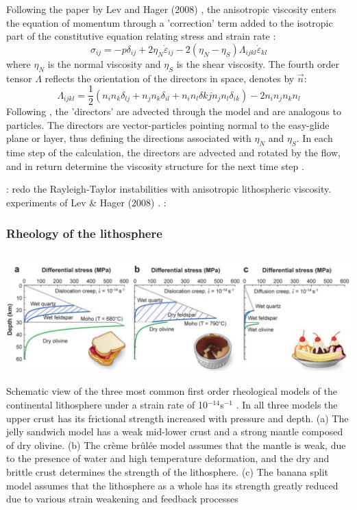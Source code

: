 Following the paper by Lev and Hager (2008) \cite{leha08}, 
the anisotropic viscosity enters the equation of momentum through a 'correction'
term added to the isotropic part of the constitutive equation relating
stress and strain rate \cite{mumh02}:
\[
\sigma_{ij} = -p \delta_{ij} + 2 \eta_N \dot{\varepsilon}_{ij}  - 2(\eta_N-\eta_S)\Lambda_{ijkl}\dot{\varepsilon}_{kl} 
\]
where $\eta_N$ is the normal viscosity and $\eta_S$ is the shear viscosity. 
The fourth order tensor $\Lambda$ reflects the orientation of the directors in space, denotes by $\vec{n}$:
\[
\Lambda_{ijkl}=\frac{1}{2} (n_i n_k \delta_{lj} + n_j n_k \delta_{il} + n_i n_l \delta{kj} n_j n_l \delta_{ik} )
- 2 n_i n_j n_k n_l 
\]
Following \cite{modm03,mumh02}, the 'directors' are advected through the model and are 
analogous to particles. The directors are
vector-particles pointing normal to the easy-glide plane or layer,
thus defining the directions associated with $\eta_N$ and $\eta_S$. 
In each time
step of the calculation, the directors are advected and rotated by the
flow, and in return determine the viscosity structure for the next time
step \cite{mumc04}.



\mscthesis: redo the Rayleigh-Taylor instabilities with anisotropic lithospheric viscosity.
experiments of Lev \& Hager (2008) \cite{leha08}.
\Literature: \cite{mumh02,vatb98,mumc04,mumh02,mima04,rida78,saab84}

\subsubsection{Rheology of the lithosphere}


\begin{center}
\includegraphics[height=5cm]{images/rheology/budr08}\\
{\scriptsize Schematic view of the three most common first order rheological models of the continental 
lithosphere under a strain rate of 10$^{-14}$s$^{-1}$ . 
In all three models the upper crust has its frictional strength increased with pressure and depth. 
(a) The jelly sandwich model has a weak mid-lower crust and a strong mantle composed of dry olivine. 
(b) The cr\`eme br\^ul\'ee model assumes that the mantle is weak, due to the presence of water and high 
temperature deformation, and the dry and brittle crust determines the strength of the lithosphere. 
(c) The banana split model assumes that the lithosphere as a whole has its strength greatly reduced
due to various strain weakening and feedback processes \cite{budr08}}
\end{center}

